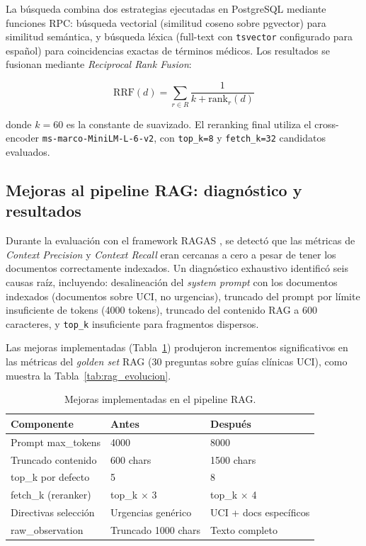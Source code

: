 La búsqueda combina dos estrategias ejecutadas en PostgreSQL mediante funciones RPC: búsqueda vectorial (similitud coseno sobre pgvector) para similitud semántica, y búsqueda léxica (full-text con \texttt{tsvector} configurado para español) para coincidencias exactas de términos médicos. Los resultados se fusionan mediante \textit{Reciprocal Rank Fusion}:

\begin{equation}
\text{RRF}(d) = \sum_{r \in R} \frac{1}{k + \text{rank}_r(d)}
\label{eq:rrf_impl}
\end{equation}

donde $k = 60$ es la constante de suavizado. El reranking final utiliza el cross-encoder \texttt{ms-marco-MiniLM-L-6-v2}, con \texttt{top\_k=8} y \texttt{fetch\_k=32} candidatos evaluados.

\subsection{Mejoras al pipeline \acs{RAG}: diagnóstico y resultados}
\label{sec:rag_mejoras}

Durante la evaluación con el framework \ac{RAGAS} \parencite{Es2023ragas}, se detectó que las métricas de \textit{Context Precision} y \textit{Context Recall} eran cercanas a cero a pesar de tener los documentos correctamente indexados. Un diagnóstico exhaustivo identificó seis causas raíz, incluyendo: desalineación del \textit{system prompt} con los documentos indexados (documentos sobre \ac{UCI}, no urgencias), truncado del prompt por límite insuficiente de tokens (4000 tokens), truncado del contenido \ac{RAG} a 600 caracteres, y \texttt{top\_k} insuficiente para fragmentos dispersos.

Las mejoras implementadas (Tabla~\ref{tab:rag_mejoras}) produjeron incrementos significativos en las métricas del \textit{golden set} \ac{RAG} (30 preguntas sobre guías clínicas \ac{UCI}), como muestra la Tabla~\ref{tab:rag_evolucion}.

\begin{table}[H]
\centering
\caption{Mejoras implementadas en el pipeline \acs{RAG}.}
\label{tab:rag_mejoras}
\footnotesize
\begin{tabularx}{\columnwidth}{lXX}
\toprule
\textbf{Componente} & \textbf{Antes} & \textbf{Después} \\
\midrule
Prompt max\_tokens & 4000 & 8000 \\
Truncado contenido & 600 chars & 1500 chars \\
top\_k por defecto & 5 & 8 \\
fetch\_k (reranker) & top\_k $\times$ 3 & top\_k $\times$ 4 \\
Directivas selección & Urgencias genérico & \ac{UCI} + docs específicos \\
raw\_observation & Truncado 1000 chars & Texto completo \\
\bottomrule
\end{tabularx}
\end{table}

